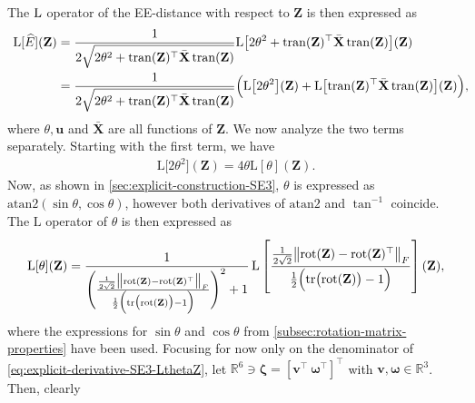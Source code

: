 The $\operatorname{L}$ operator of the EE-distance with respect to $\mathbf{Z}$ is then expressed as
\begin{align}
    \begin{split}
        \text{L}[\widehat{E}](\mathbf{Z}) &=  \frac{1}{2\sqrt{2\theta^2 + \operatorname{tran}(\mathbf{Z})^\top\bar{\mathbf{X}}\operatorname{tran}(\mathbf{Z})}} \text{L}\bigl[2\theta^2 + \operatorname{tran}(\mathbf{Z})^\top\bar{\mathbf{X}}\operatorname{tran}(\mathbf{Z})\bigr](\mathbf{Z}) \\
        &= \frac{1}{2\sqrt{2\theta^2 + \operatorname{tran}(\mathbf{Z})^\top\bar{\mathbf{X}}\operatorname{tran}(\mathbf{Z})}} \Bigl(\text{L}\bigl[2\theta^2\bigr](\mathbf{Z}) + \text{L}\bigl[\operatorname{tran}(\mathbf{Z})^\top\bar{\mathbf{X}}\operatorname{tran}(\mathbf{Z})\bigr](\mathbf{Z})\Bigr),\!\!\!\!\! \label{eq:explicit-derivative-SE3-LdhatZ-firststep}
    \end{split}
\end{align}
where $\theta, \mathbf{u}$ and $\bar{\mathbf{X}}$ are all functions of $\mathbf{Z}$. We now analyze the two terms separately. Starting with the first term, we have
\begin{align}
    \text{L}\bigl[2\theta^2\bigr](\mathbf{Z}) = 4\theta \text{L}[\theta](\mathbf{Z}).
\end{align}
Now, as shown in \cref{sec:explicit-construction-SE3}, $\theta$ is expressed as $\text{atan2}(\sin\theta, \cos\theta)$, however both derivatives of $\text{atan2}$ and $\tan^{-1}$ coincide. The $\text{L}$ operator of $\theta$ is then expressed as
\begin{align}
    \text{L}[\theta](\mathbf{Z}) = \frac{1}{\Biggl(\frac{\frac{1}{2\sqrt{2}}\bigl\|\rot(\mathbf{Z}) - \rot(\mathbf{Z})^\top\bigr\|_F}{\frac{1}{2}\Bigl(\tr\bigl(\rot(\mathbf{Z})\bigr)-1\Bigr)}\Biggr)^2+1} \Lop\left[\rule{0em}{9mm}\frac{\frac{1}{2\sqrt{2}}\bigl\|\rot(\mathbf{Z}) - \rot(\mathbf{Z})^\top\bigr\|_F}{\frac{1}{2}\Bigl(\tr\bigl(\rot(\mathbf{Z})\bigr)-1\Bigr)}\right](\mathbf{Z}), \label{eq:explicit-derivative-SE3-LthetaZ}
\end{align}
where the expressions for $\sin\theta$ and $\cos\theta$ from \cref{subsec:rotation-matrix-properties} have been used. Focusing for now only on the denominator of \eqref{eq:explicit-derivative-SE3-LthetaZ}, let $\mathbb{R}^6\ni\boldsymbol{\zeta} = [\mathbf{v}^\top\ \boldsymbol{\omega}^\top]^\top$ with $\mathbf{v}, \boldsymbol{\omega}\in\mathbb{R}^3$. Then, clearly
